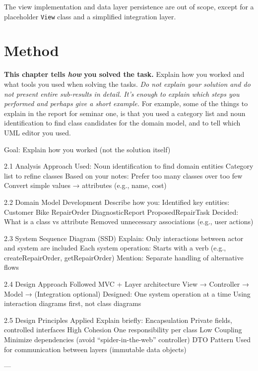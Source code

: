 \documentclass[a4paper]{scrartcl}
\begin{document}
The view implementation and data layer persistence are out of scope, except 
for a placeholder \texttt{View} class and a simplified integration layer.

\section{Method}

\textbf{This chapter tells \textit{how} you solved the task.} Explain how you worked and what tools you used when solving the tasks. \textit{Do not explain your solution and do not present entire sub-results in detail. It's enough to explain which steps you performed and perhaps give a short example.} For example, some of the things to explain in the report for seminar one, is that you used a category list and noun identification to find class candidates for the domain model, and to tell which UML editor you used.

Goal: Explain how you worked (not the solution itself)

2.1 Analysis Approach
Used:
Noun identification to find domain entities
Category list to refine classes
Based on your notes:
Prefer too many classes over too few
Convert simple values → attributes (e.g., name, cost)

2.2 Domain Model Development
Describe how you:
Identified key entities:
Customer
Bike
RepairOrder
DiagnosticReport
ProposedRepairTask
Decided:
What is a class vs attribute
Removed unnecessary associations (e.g., user actions)

2.3 System Sequence Diagram (SSD)
Explain:
Only interactions between actor and system are included
Each system operation:
Starts with a verb (e.g., createRepairOrder, getRepairOrder)
Mention:
Separate handling of alternative flows

2.4 Design Approach
Followed MVC + Layer architecture
View → Controller → Model → (Integration optional)
Designed:
One system operation at a time
Using interaction diagrams first, not class diagrams


2.5 Design Principles Applied
Explain briefly:
Encapsulation
Private fields, controlled interfaces
High Cohesion
One responsibility per class
Low Coupling
Minimize dependencies (avoid “spider-in-the-web” controller)
DTO Pattern
Used for communication between layers (immutable data objects)

---
\end{document}
